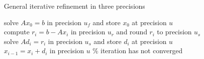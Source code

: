 \begin{algorithm}[h]
  \caption{General iterative refinement in three precisions}
  \label{alg:iterative_refinement}
  \SetAlgoLined
  solve $Ax_0=b$ in precision $u_f$ and store $x_0$ at precision $u$ \\
   {
    compute $r_i = b-Ax_i$ in precision $u_r$ and round $r_i$ to precision $u_s$ \\
    solve $Ad_i=r_i$ in precision $u_s$ and store $d_i$ at precision $u$ \\
    $x_{i-1}=x_i+d_i$ in precision $u$}
  \% iteration has not converged
\end{algorithm}